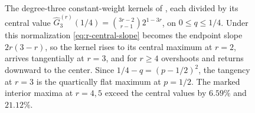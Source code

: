 \documentclass[11pt,a4paper]{amsart}
\numberwithin{equation}{section}
\theoremstyle{plain}
\theoremstyle{definition}
\begin{document}
\begin{figure}[t]
\caption{The degree-three constant-weight kernels of
, each divided by its central value
\(\widehat G^{(r)}_3(1/4)=\binom{3r-2}{r-1}2^{1-3r}\), on \(0\le q\le1/4\).
Under this normalization \eqref{eq:r-central-slope} becomes the endpoint
slope \(2r(3-r)\), so the kernel rises to its central maximum at \(r=2\),
arrives tangentially at \(r=3\), and for \(r\ge4\) overshoots and returns
downward to the center.  Since \(1/4-q=(p-1/2)^2\), the tangency at \(r=3\)
is the quartically flat maximum at \(p=1/2\).  The marked interior maxima at
\(r=4,5\) exceed the central values by \(6.59\%\) and \(21.12\%\).}
\label{fig:multiplicity-threshold}
\end{figure}
\end{document}
